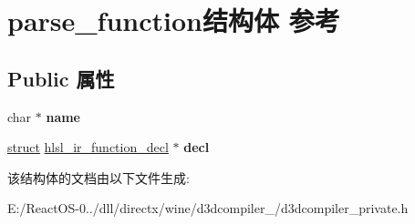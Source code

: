 \hypertarget{structparse__function}{}\section{parse\+\_\+function结构体 参考}
\label{structparse__function}
\subsection*{Public 属性}
\begin{DoxyCompactItemize}
\item 
\mbox{\label{structparse__function_a27e297c710aecdaaf2880de3b1b79d78}} 
char $\ast$ {\bfseries name}
\item 
\mbox{\label{structparse__function_a3037b6c794297e8cd6225497cd955a2e}} 
\hyperlink{interfacestruct}{struct} \hyperlink{structhlsl__ir__function__decl}{hlsl\+\_\+ir\+\_\+function\+\_\+decl} $\ast$ {\bfseries decl}
\end{DoxyCompactItemize}


该结构体的文档由以下文件生成\+:\begin{DoxyCompactItemize}
\item 
E\+:/\+React\+O\+S-\/0../dll/directx/wine/d3dcompiler\+\_/d3dcompiler\+\_\+private.\+h\end{DoxyCompactItemize}
